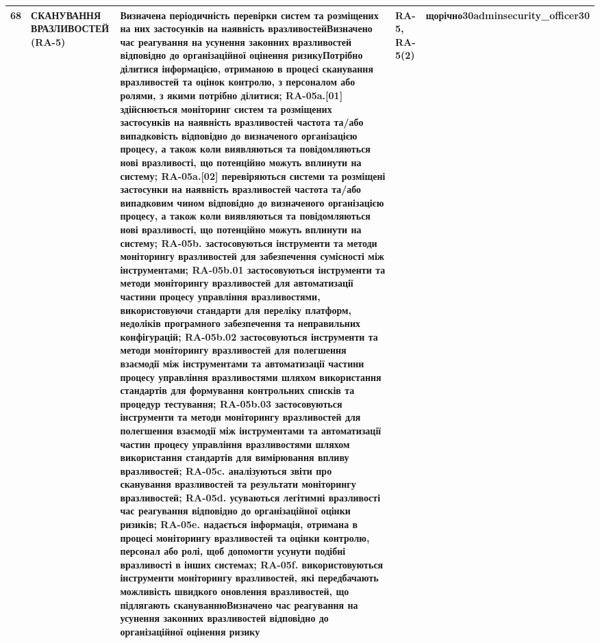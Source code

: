 \documentclass[10pt]{article}
\begin{document}
\begin{longtable}{|c|>{\raggedright\arraybackslash}p{2.5cm}|>{\raggedright\arraybackslash}p{4cm}|>{\raggedright\arraybackslash}p{3.5cm}|>{\raggedright\arraybackslash}p{5.5cm}|}
68 & СКАНУВАННЯ ВРАЗЛИВОСТЕЙ (RA-5) & Визначена періодичність перевірки систем та розміщених на них застосунків на наявність вразливостей\newline Визначено час реагування на усунення законних вразливостей відповідно до організаційної оцінення ризику\newline Потрібно ділитися інформацією, отриманою в процесі сканування вразливостей та оцінок контролю, з персоналом або ролями, з якими потрібно ділитися; RA-05a.[01] здійснюється моніторинг систем та розміщених застосунків на наявність вразливостей частота та/або випадковість відповідно до визначеного організацією процесу, а також коли виявляються та повідомляються нові вразливості, що потенційно можуть вплинути на систему; RA-05a.[02] перевіряються системи та розміщені застосунки на наявність вразливостей частота та/або випадковим чином відповідно до визначеного організацією процесу, а також коли виявляються та повідомляються нові вразливості, що потенційно можуть вплинути на систему; RA-05b. застосовуються інструменти та методи моніторингу вразливостей для забезпечення сумісності між інструментами; RA-05b.01 застосовуються інструменти та методи моніторингу вразливостей для автоматизації частини процесу управління вразливостями, використовуючи стандарти для переліку платформ, недоліків програмного забезпечення та неправильних конфігурацій; RA-05b.02 застосовуються інструменти та методи моніторингу вразливостей для полегшення взаємодії між інструментами та автоматизації частини процесу управління вразливостями шляхом використання стандартів для формування контрольних списків та процедур тестування; RA-05b.03 застосовуються інструменти та методи моніторингу вразливостей для полегшення взаємодії між інструментами та автоматизації частин процесу управління вразливостями шляхом використання стандартів для вимірювання впливу вразливостей; RA-05c. аналізуються звіти про сканування вразливостей та результати моніторингу вразливостей; RA-05d. усуваються легітимні вразливості час реагування відповідно до організаційної оцінки ризиків; RA-05e. надається інформація, отримана в процесі моніторингу вразливостей та оцінки контролю, персонал або ролі, щоб допомогти усунути подібні вразливості в інших системах; RA-05f. використовуються інструменти моніторингу вразливостей, які передбачають можливість швидкого оновлення вразливостей, що підлягають скануванню\newline Визначено час реагування на усунення законних вразливостей відповідно до організаційної оцінення ризику & RA-5, RA-5(2) & \textbf{щорічно}\newline \textbf{30}\newline \textbf{adminsecurity\_\allowbreak{}officer}\newline \textbf{30} \\ \hline

\end{longtable}
\end{document}
